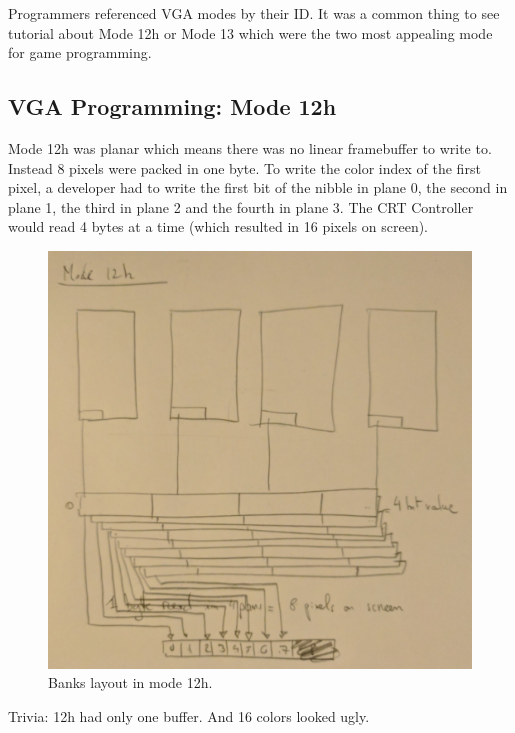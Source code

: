 \documentclass[book.tex]{subfiles}
\begin{document}
 Programmers referenced VGA modes by their ID. It was a common thing to see tutorial about Mode 12h or Mode 13 which were the two most appealing mode for game programming.


 
 

 \subsection{VGA Programming: Mode 12h}
Mode 12h was planar which means there was no linear framebuffer to write to. Instead 8 pixels were packed in one byte. To write the color index of the first pixel, a developer had to write the first bit of the nibble in plane 0, the second in plane 1, the third in plane 2 and the fourth in plane 3. The CRT Controller would read 4 bytes at a time (which resulted in 16 pixels on screen).\\
\par
\begin{figure}[H]
\centering
  
      \includegraphics[width=\textwidth]{imgs/mode_12h.png}
    
\caption{Banks layout in mode 12h.}
\end{figure}
\par
Trivia: 12h had only one buffer. And 16 colors looked ugly.
 
\end{document}
